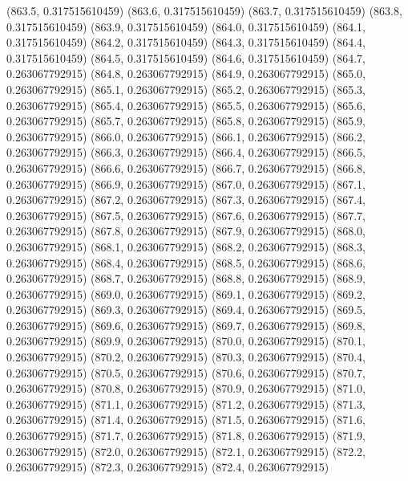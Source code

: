 {					(863.5, 0.317515610459)
					(863.6, 0.317515610459)
					(863.7, 0.317515610459)
					(863.8, 0.317515610459)
					(863.9, 0.317515610459)
					(864.0, 0.317515610459)
					(864.1, 0.317515610459)
					(864.2, 0.317515610459)
					(864.3, 0.317515610459)
					(864.4, 0.317515610459)
					(864.5, 0.317515610459)
					(864.6, 0.317515610459)
					(864.7, 0.263067792915)
					(864.8, 0.263067792915)
					(864.9, 0.263067792915)
					(865.0, 0.263067792915)
					(865.1, 0.263067792915)
					(865.2, 0.263067792915)
					(865.3, 0.263067792915)
					(865.4, 0.263067792915)
					(865.5, 0.263067792915)
					(865.6, 0.263067792915)
					(865.7, 0.263067792915)
					(865.8, 0.263067792915)
					(865.9, 0.263067792915)
					(866.0, 0.263067792915)
					(866.1, 0.263067792915)
					(866.2, 0.263067792915)
					(866.3, 0.263067792915)
					(866.4, 0.263067792915)
					(866.5, 0.263067792915)
					(866.6, 0.263067792915)
					(866.7, 0.263067792915)
					(866.8, 0.263067792915)
					(866.9, 0.263067792915)
					(867.0, 0.263067792915)
					(867.1, 0.263067792915)
					(867.2, 0.263067792915)
					(867.3, 0.263067792915)
					(867.4, 0.263067792915)
					(867.5, 0.263067792915)
					(867.6, 0.263067792915)
					(867.7, 0.263067792915)
					(867.8, 0.263067792915)
					(867.9, 0.263067792915)
					(868.0, 0.263067792915)
					(868.1, 0.263067792915)
					(868.2, 0.263067792915)
					(868.3, 0.263067792915)
					(868.4, 0.263067792915)
					(868.5, 0.263067792915)
					(868.6, 0.263067792915)
					(868.7, 0.263067792915)
					(868.8, 0.263067792915)
					(868.9, 0.263067792915)
					(869.0, 0.263067792915)
					(869.1, 0.263067792915)
					(869.2, 0.263067792915)
					(869.3, 0.263067792915)
					(869.4, 0.263067792915)
					(869.5, 0.263067792915)
					(869.6, 0.263067792915)
					(869.7, 0.263067792915)
					(869.8, 0.263067792915)
					(869.9, 0.263067792915)
					(870.0, 0.263067792915)
					(870.1, 0.263067792915)
					(870.2, 0.263067792915)
					(870.3, 0.263067792915)
					(870.4, 0.263067792915)
					(870.5, 0.263067792915)
					(870.6, 0.263067792915)
					(870.7, 0.263067792915)
					(870.8, 0.263067792915)
					(870.9, 0.263067792915)
					(871.0, 0.263067792915)
					(871.1, 0.263067792915)
					(871.2, 0.263067792915)
					(871.3, 0.263067792915)
					(871.4, 0.263067792915)
					(871.5, 0.263067792915)
					(871.6, 0.263067792915)
					(871.7, 0.263067792915)
					(871.8, 0.263067792915)
					(871.9, 0.263067792915)
					(872.0, 0.263067792915)
					(872.1, 0.263067792915)
					(872.2, 0.263067792915)
					(872.3, 0.263067792915)
					(872.4, 0.263067792915)
}
